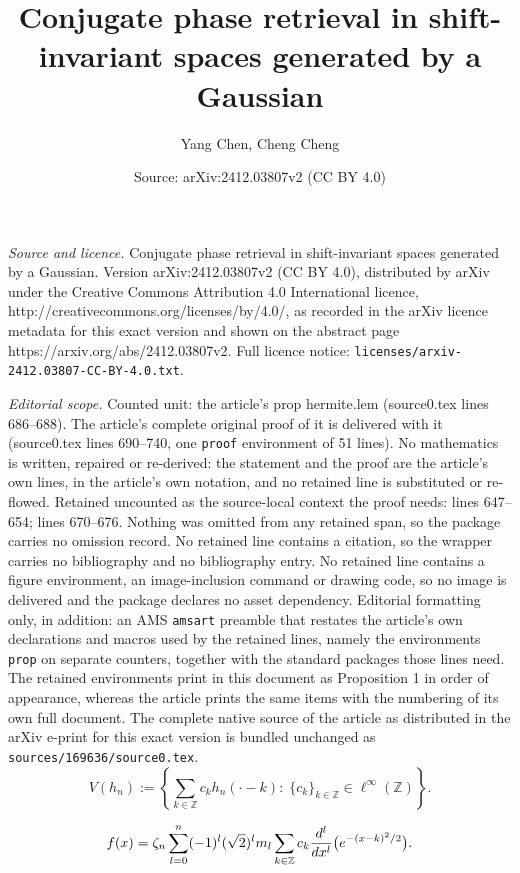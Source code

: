 \documentclass[10pt,a4paper]{amsart}
\title{Conjugate phase retrieval in shift-invariant spaces generated by a Gaussian}
\author{Yang Chen, Cheng Cheng}
\date{Source: arXiv:2412.03807v2 (CC BY 4.0)}
\begin{document}
\maketitle

\noindent\emph{Source and licence.} Conjugate phase retrieval in shift-invariant spaces generated by a Gaussian. Version arXiv:2412.03807v2 (CC BY 4.0), distributed by arXiv under the Creative Commons Attribution 4.0 International licence, http://creativecommons.org/licenses/by/4.0/, as recorded in the arXiv licence metadata for this exact version and shown on the abstract page https://arxiv.org/abs/2412.03807v2. Full licence notice: \texttt{licenses/arxiv-2412.03807-CC-BY-4.0.txt}.\par\smallskip

\noindent\textit{Editorial scope.} Counted unit: the article's prop hermite.lem (source0.tex lines 686--688). The article's complete original proof of it is delivered with it (source0.tex lines 690--740, one \texttt{proof} environment of 51 lines). No mathematics is written, repaired or re-derived: the statement and the proof are the article's own lines, in the article's own notation, and no retained line is substituted or re-flowed.  Retained uncounted as the source-local context the proof needs: lines 647--654; lines 670--676.  Nothing was omitted from any retained span, so the package carries no omission record.  No retained line contains a citation, so the wrapper carries no bibliography and no bibliography entry.  No retained line contains a figure environment, an image-inclusion command or drawing code, so no image is delivered and the package declares no asset dependency.  Editorial formatting only, in addition: an AMS \texttt{amsart} preamble that restates the article's own declarations and macros used by the retained lines, namely the environments \texttt{prop} on separate counters, together with the standard packages those lines need.  The retained environments print in this document as Proposition 1 in order of appearance, whereas the article prints the same items with the numbering of its own full document.  The complete native source of the article as distributed in the arXiv e-print for this exact version is bundled unchanged as \texttt{sources/169636/source0.tex}.
\begin{equation}\label{h.sis}
V(h_n)
:=
\left\{
\sum_{k\in\mathbb Z} c_k h_n(\cdot-k): \;
\{c_k\}_{k\in\mathbb Z}\in\ell^\infty(\mathbb Z)
\right\}.
\end{equation}

\begin{equation}\label{hermite.sis.expansion}
f(x)
=
\zeta_n\sum_{l=0}^{n}(-1)^l(\sqrt2)^l m_l
\sum_{k\in\mathbb Z} c_k
\frac{{\rm d}^l}{{\rm d}x^l}\big(e^{-(x-k)^2/2}\big).
\end{equation}
\end{document}
